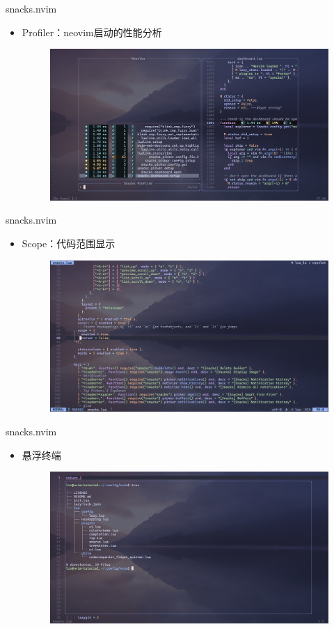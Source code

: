 \documentclass[aspectratio=169]{ctexbeamer}
\begin{document}
  \begin{frame}{snacks.nvim}
    \begin{itemize}
      \item Profiler：neovim启动的性能分析
        \begin{figure}[H]
          \centering
          \includegraphics[width=0.7\linewidth]{./Figures/Snacks_Config_8_Profiler.jpg}
        \end{figure}
    \end{itemize}
  \end{frame}

  \begin{frame}{snacks.nvim}
    \begin{itemize}
      \item Scope：代码范围显示 %
        \begin{figure}[H]
          \centering
          \includegraphics[width=0.7\linewidth]{./Figures/Snacks_Config_9_Scope.jpg}
        \end{figure}
    \end{itemize}
  \end{frame}

  \begin{frame}{snacks.nvim}
    \begin{itemize}
      \item 悬浮终端
        \begin{figure}[H]
          \centering
          \includegraphics[width=0.7\linewidth]{./Figures/Snacks_Config_10_Terminal.jpg}
        \end{figure}
    \end{itemize}
  \end{frame}
\end{document}
